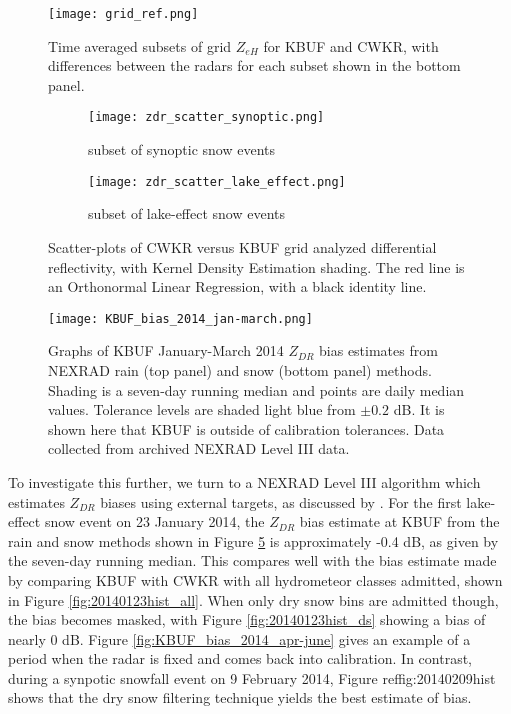 \begin{figure}
\texttt{[image: grid\_ref.png]}\vspace*{-5mm} 
\caption{Time averaged subsets of grid $Z_{eH}$ for KBUF and CWKR, with differences between the radars for each subset shown in the bottom panel.}
\label{fig:grid_ref}
\end{figure}

\begin{figure}[h]
\centering
   \begin{subfigure}{0.49\linewidth} \centering
     \texttt{[image: zdr\_scatter\_synoptic.png]}
     \caption{subset of synoptic snow events}\label{fig:zdr_scatter_synoptic}
   \end{subfigure}
   \begin{subfigure}{0.49\linewidth} \centering
     \texttt{[image: zdr\_scatter\_lake\_effect.png]}
     \caption{subset of lake-effect snow events}\label{fig:zdr_scatter_lake_effect}
   \end{subfigure}
\caption{Scatter-plots of CWKR versus KBUF grid analyzed differential reflectivity, with Kernel Density Estimation shading. The red line is an Orthonormal Linear Regression, with a black identity line.} \label{fig:zdr_scatter}
\end{figure}

\begin{figure}
\texttt{[image: KBUF\_bias\_2014\_jan-march.png]}
\caption{Graphs of KBUF January-March 2014 $Z_{DR}$ bias estimates from NEXRAD rain (top panel) and snow (bottom panel) methods. Shading is a seven-day running median and points are daily median values. Tolerance levels are shaded light blue from $\pm0.2$ dB. It is shown here that KBUF is outside of calibration tolerances. Data collected from archived NEXRAD Level III data.} 
\label{fig:KBUF_bias_2014_jan-march}
\end{figure}





To investigate this further, we turn to a NEXRAD Level III algorithm which estimates $Z_{DR}$ biases using external targets, as discussed by \cite{Cunningham2013}. For the first lake-effect snow event on 23 January 2014, the $Z_{DR}$ bias estimate at KBUF from the rain and snow methods shown in Figure \ref{fig:KBUF_bias_2014_jan-march} is approximately -0.4 dB, as given by the seven-day running median. This compares well with the bias estimate made by comparing KBUF with CWKR with all hydrometeor classes admitted, shown in Figure \ref{fig:20140123hist_all}. When only dry snow bins are admitted though, the bias becomes masked, with Figure \ref{fig:20140123hist_ds} showing a bias of nearly 0 dB. Figure \ref{fig:KBUF_bias_2014_apr-june} gives an example of a period when the radar is fixed and comes back into calibration. In contrast, during a synpotic snowfall event on 9 February 2014, Figure ref{fig:20140209hist} shows that the dry snow filtering technique yields the best estimate of bias. 




